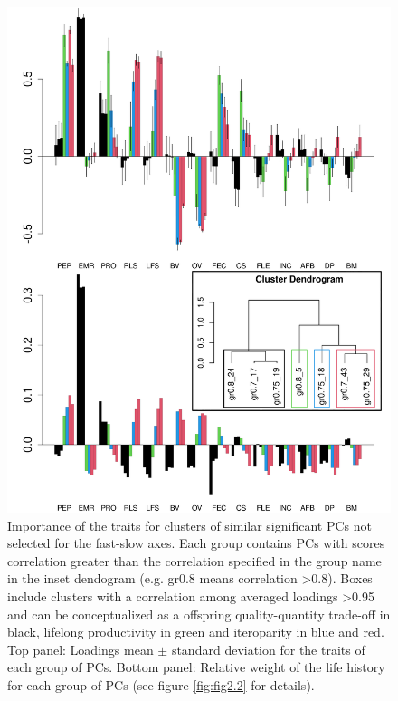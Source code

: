 \begin{figure}
\centering
\includegraphics[width=\textwidth]{./Figures/chapter02/fig3-Secondary axes.png}
\caption[Alternative axes groups and PC loadings]{
Importance of the traits for clusters of similar significant PCs not selected
for the fast-slow axes. Each group contains PCs with scores correlation greater
than the correlation specified in the group name in the inset dendogram (e.g.
gr0.8 means correlation \textgreater{0.8}). Boxes include clusters with a
correlation among averaged loadings \textgreater{0.95} and can be conceptualized
as a offspring quality-quantity trade-off in black, lifelong productivity in
green and iteroparity in blue and red.
Top panel: Loadings mean $\pm$ standard deviation for the traits of each group
of PCs. Bottom panel: Relative weight of the life history for each group of PCs
(see figure \ref{fig:fig2.2} for details).}
\label{fig:fig2.3}
\end{figure}


